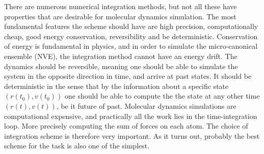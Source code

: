 \documentclass[twoside,english]{uiofysmaster}
\begin{document}
There are numerous numerical integration methods, but not all these have properties that are desirable for molecular dynamics simulation. 
The most fundamental features the scheme should have are high precision, computationally cheap, good energy conservation, reversibility and be deterministic.
Conservation of energy is fundamental in physics, and in order to simulate the micro-canonical ensemble (NVE), the integration method cannot have an energy drift.
The dynamics should be reversible, meaning one should be able to simulate the system in the opposite direction in time, and arrive at past states.
It should be deterministic in the sense that by the information about a specific state $(r(t_0), v(t_0))$ one should be able to compute the the state at any other time $(r(t), v(t))$, be it future of past.
Molecular dynamics simulations are computational expensive, and practically all the work lies in the time-integration loop. More precisely computing the sum of forces on each atom. 
The choice of integration scheme is therefore very important. 
As it turns out, probably the best scheme for the task is also one of the simplest. 
\end{document}

